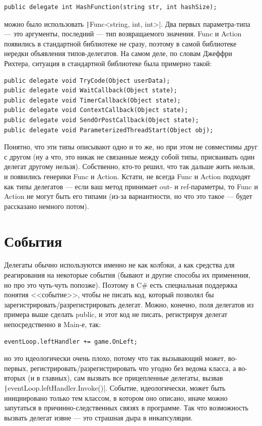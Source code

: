 \documentclass{../../text-style}
\begin{document}
\begin{verbatim}
public delegate int HashFunction(string str, int hashSize);
\end{verbatim}

можно было использовать \texttt|Func<string, int, int>|. Два первых параметра-типа --- это аргументы, последний --- тип возвращаемого значения. Func и Action появились в стандартной библиотеке не сразу, поэтому в самой библиотеке нередки объявления типов-делегатов. На самом деле, по словам Джеффри Рихтера, ситуация в стандартной библиотеке была примерно такой:

\begin{verbatim}
public delegate void TryCode(Object userData);
public delegate void WaitCallback(Object state);
public delegate void TimerCallback(Object state);
public delegate void ContextCallback(Object state);
public delegate void SendOrPostCallback(Object state);
public delegate void ParameterizedThreadStart(Object obj);
\end{verbatim}

Понятно, что эти типы описывают одно и то же, но при этом не совместимы друг с другом (ну а что, это никак не связанные между собой типы, присваивать один делегат другому нельзя). Собственно, кто-то решил, что так дальше жить нельзя, и появились генерики Func и Action. Кстати, не всегда Func и Action подходят как типы делегатов --- если ваш метод принимает out- и ref-параметры, то Func и Action не могут быть его типами (из-за вариантности, но что это такое --- будет рассказано немного потом).

\section{События}

Делегаты обычно используются именно не как колбэки, а как средства для реагирования на некоторые события (бывают и другие способы их применения, но про это чуть-чуть попозже). Поэтому в C\# есть специальная поддержка понятия <<событие>>, чтобы не писать код, который позволял бы зарегистрировать/разрегистрировать делегат. Можно, конечно, поля делегатов из примера выше сделать public, и этот код не писать, регистрируя делегат непосредственно в Main-е, так:

\begin{verbatim}
eventLoop.leftHandler += game.OnLeft;
\end{verbatim}

но это идеологически очень плохо, потому что так вызывающий может, во-первых, регистрировать/разрегистрировать что угодно без ведома класса, а во-вторых (и в главных), сам вызвать все прицепленные делегаты, вызвав \texttt|eventLoop.leftHandler.Invoke()|. Событие, идеологически, может быть инициировано только тем классом, в котором оно описано, иначе можно запутаться в причинно-следственных связях в программе. Так что возможность вызвать делегат извне --- это страшная дыра в инкапсуляции.
\end{document}
